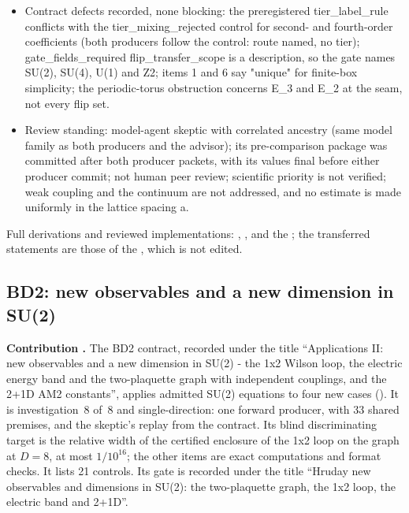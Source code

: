 \begin{gatequote}
\begin{itemize}
enumerations and fixtures audit their finite consequences.
\item Contract defects recorded, none blocking: the preregistered
tier\_label\_rule conflicts with the tier\_mixing\_rejected control for
second- and fourth-order coefficients (both producers follow the control:
route named, no tier); gate\_fields\_required flip\_transfer\_scope is a
description, so the gate names SU(2), SU(4), U(1) and Z2; items 1 and 6 say
"unique" for finite-box simplicity; the periodic-torus obstruction concerns
E\_3 and E\_2 at the seam, not every flip set.
\item Review standing: model-agent skeptic with correlated ancestry (same
model family as both producers and the advisor); its pre-comparison package
was committed after both producer packets, with its values final before either
producer commit; not human peer review; scientific priority is not verified;
weak coupling and the continuum are not addressed, and no estimate is made
uniformly in the lattice spacing a.
\end{itemize}
\end{gatequote}
Full derivations and reviewed implementations:
,
,
 and the
; the transferred
statements are those of the , which is not edited.

\subsection{BD2: new observables and a new dimension in SU(2)}
\label{sec:bd2}

\textbf{Contribution .} The BD2 contract, recorded
under the title ``Applications II: new observables and a new dimension in
SU(2) - the 1x2 Wilson loop, the electric energy band and the two-plaquette
graph with independent couplings, and the 2+1D AM2 constants'', applies
admitted SU(2) equations to four new cases
(). It is
investigation~8 of~8 and single-direction: one forward producer, with 33
shared premises, and the skeptic's replay from the contract. Its blind
discriminating target is the relative width of the certified enclosure of
the 1x2 loop on the graph at $D=8$, at most $1/10^{16}$; the other items are
exact computations and format checks. It lists 21 controls. Its gate is
recorded under the title ``Hruday new observables and dimensions in SU(2):
the two-plaquette graph, the 1x2 loop, the electric band and 2+1D''.

